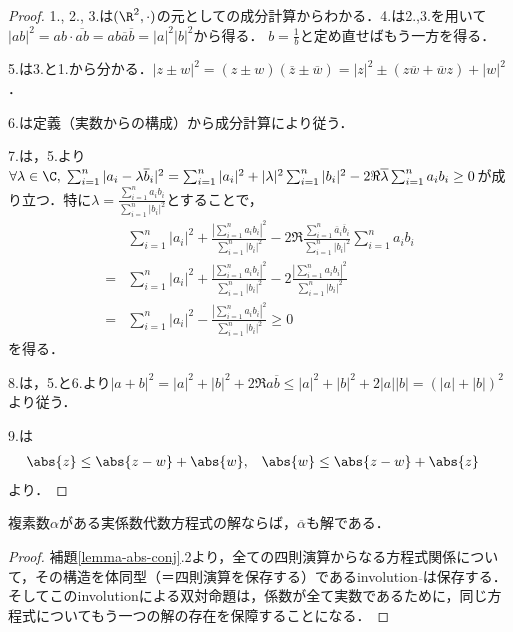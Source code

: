 \documentclass[uplatex, dvipdfmx]{jsreport}
\begin{document}
\begin{proof}
    1., 2., 3.は$(\R^2,\cdot)$の元としての成分計算からわかる．4.は2.,3.を用いて$|ab|^2=ab\cdot\overline{ab}=ab\overline{a}\overline{b}=|a|^2|b|^2$から得る．
    $b=\frac{1}{b}$と定め直せばもう一方を得る．

    5.は3.と1.から分かる．$|z\pm w|^2=(z\pm w)(\overline{z}\pm\overline{w})=|z|^2\pm(z\overline{w}+\overline{w}z)+|w|^2$．
    
    6.は定義（実数からの構成）から成分計算により従う．
    
    7.は，5.より$\forall\lambda\in\C,\;\sum^n_{i=1}|a_i-\lambda\overline{b}_i|^2=\sum^n_{i=1}|a_i|^2+|\lambda|^2\sum^n_{i=1}|b_i|^2-2\Re\overline{\lambda}\sum^n_{i=1}a_ib_i\ge 0$が成り立つ．特に$\lambda=\frac{\sum^n_{i=1}a_ib_i}{\sum^n_{i=1}|b_i|^2}$とすることで，
    \begin{align*}
        &\sum^n_{i=1}|a_i|^2+\frac{\left|\sum^n_{i=1}a_ib_i\right|^2}{\sum^n_{i=1}|b_i|^2}-2\Re\frac{\sum^n_{i=1}\overline{a}_i\overline{b}_i}{\sum^n_{i=1}|b_i|^2}\sum^n_{i=1}a_ib_i\\
        =&\sum^n_{i=1}|a_i|^2+\frac{\left|\sum^n_{i=1}a_ib_i\right|^2}{\sum^n_{i=1}|b_i|^2}-2\frac{\left|\sum^n_{i=1}a_ib_i\right|^2}{\sum^n_{i=1}|b_i|^2}\\
        =&\sum^n_{i=1}|a_i|^2-\frac{\left|\sum^n_{i=1}a_ib_i\right|^2}{\sum^n_{i=1}|b_i|^2}\ge 0
    \end{align*}
    を得る．

    8.は，5.と6.より$|a+b|^2=|a|^2+|b|^2+2\Re a\overline{b}\le |a|^2+|b|^2+2|a||b|=(|a|+|b|)^2$より従う．

    9.は
    \begin{align}
        \abs{z}&\le\abs{z-w}+\abs{w},& \abs{w}&\le\abs{z-w}+\abs{z}
    \end{align}
    より．
\end{proof}

\begin{proposition}
    複素数$\alpha$がある実係数代数方程式の解ならば，$\overline{\alpha}$も解である．
\end{proposition}
\begin{proof}
    補題\ref{lemma-abs-conj}.2より，全ての四則演算からなる方程式関係について，その構造を体同型（＝四則演算を保存する）であるinvolution$\overline{ }$は保存する．
    そしてこのinvolutionによる双対命題は，係数が全て実数であるために，同じ方程式についてもう一つの解の存在を保障することになる．
\end{proof}
\end{document}
